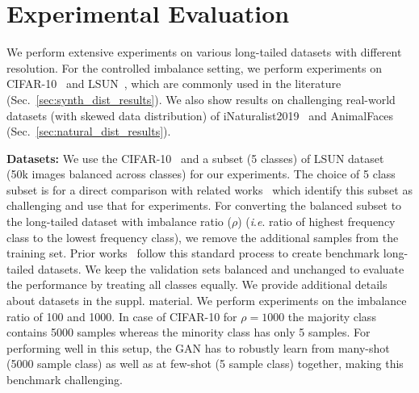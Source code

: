 \documentclass[runningheads,table]{llncs}
\newcommand{\ie}{\textit{i}.\textit{e}. }
\begin{document}
\section{Experimental Evaluation}
\label{sec:expts}
We perform extensive experiments on various long-tailed datasets with different resolution. For the controlled imbalance setting, we perform experiments on CIFAR-10~\cite{Krizhevsky09learningmultiple} and LSUN~\cite{journals/corr/YuZSSX15}, which are commonly used in the literature~\cite{cao2019learning, cui2019classbalancedloss, santurkar2018classification} (Sec.~\ref{sec:synth_dist_results}). We also show results on challenging real-world datasets (with skewed data distribution) of iNaturalist2019~\cite{inat19} and AnimalFaces~\cite{kolouri2016sliced} (Sec.~\ref{sec:natural_dist_results}). 

\noindent\textbf{Datasets:} We use the CIFAR-10~\cite{Krizhevsky09learningmultiple} and a subset (5 classes) of LSUN dataset~\cite{journals/corr/YuZSSX15} (50k images balanced across classes) for our experiments. 
The choice of 5 class subset is for a direct comparison with related works~\cite{rangwani2021class, santurkar2018classification} which identify this subset as challenging and use that for experiments.
For converting the balanced subset to the long-tailed dataset with imbalance ratio ($\rho$) (\ie ratio of highest frequency class to the lowest frequency class), we remove the additional samples from the training set. Prior works~\cite{cao2019learning, cui2019classbalancedloss, menon2021longtail} follow this standard process to create benchmark long-tailed datasets. We keep the validation sets balanced and unchanged to evaluate the performance by treating all classes equally. We provide additional details about datasets in the suppl. material. We perform experiments on the imbalance ratio of 100 and 1000. In case of CIFAR-10 for $\rho = 1000$ the majority class contains 5000 samples whereas the minority class has only 5 samples. For performing well in this setup, the GAN has to robustly learn from many-shot (5000 sample class) as well as at few-shot (5 sample class) together, making this benchmark challenging.
\end{document}
